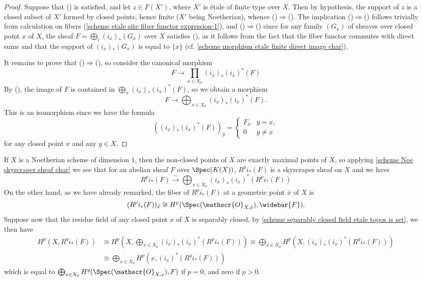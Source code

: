 \begin{proof}
Suppose that () is satisfied, and let $z\in F(X')$, where $X'$ is \'etale of finite type over $X$. Then by hypothesis, the support of $z$ is a closed subset of $X'$ formed by closed points, hence finite ($X'$ being Noetherian), whence ()$\Rightarrow$(). The implication ()$\Rightarrow$() follows trivially from calculation on fibers (\cref{scheme etale site fiber functor expression-1}), and ()$\Rightarrow$() since for any family $(G_x)$ of sheaves over closed point $x$ of $X$, the sheaf $F=\bigoplus_i(i_x)_*(G_x)$ over $X$ satisfies (), as it follows from the fact that the fiber functor commutes with direct sums and that the support of $(i_x)_*(G_x)$ is equal to $\{x\}$ (cf. \cref{scheme morphism etale finite direct image char}).\par
It remains to prove that ()$\Rightarrow$(), so consider the canonical morphism
\[F\to \prod_{x\in X_0}(i_x)_*(i_x)^*(F)\]
By (), the image of $F$ is contained in $\bigoplus_x(i_x)_*(i_x)^*(F)$, so we obtain a morphism
\[F\to\bigoplus_{x\in X_0}(i_x)_*(i_x)^*(F).\]
This is an isomorphism since we have the formula
\[((i_x)_*(i_x)^*(F))_{\bar{y}}=\begin{cases}
F_{\bar{x}}&y=x,\\
0&y\neq x
\end{cases}\]
for any closed point $x$ and any $y\in X$.
\end{proof}

If $X$ is a Noetherian scheme of dimension $1$, then the non-closed points of $X$ are exactly maximal points of $X$, so applying \cref{scheme Noe skyscraper sheaf char} we see that for an abelian sheaf $F$ over $\Spec(K(X))$, $R^pi_*(F)$ is a skyscraper sheaf on $X$ and we have
\[R^pi_*(F) \stackrel{\sim}{\to} \bigoplus_{x\in X_0}(i_x)_*(i_x)^*(R^pi_*(F))\]
On the other hand, as we have already remarked, the fiber of $R^pi_*(F)$ at a geometric point $\bar{x}$ of $X$ is 
\[(R^pi_*(F))_{\bar{x}}\cong H^p(\Spec(\mathscr{O}_{X,\bar{x}}),\widebar{F}).\]
Suppose now that the residue field of any closed point $x$ of $X$ is separably closed, by \cref{scheme separably closed field etale topos is set}, we then have
\begin{align*}
H^p(X,R^qi_*(F))&\cong H^p(X,\bigoplus_{x\in X_0}(i_x)_*(i_x)^*(R^pi_*(F)))\cong \bigoplus_{x\in X_0}H^p(X,(i_x)_*(i_x)^*(R^qi_*(F)))\\
&\cong \bigoplus_{x\in X_0}H^p(x,(i_x)^*(R^qi_*(F)))
\end{align*}
which is equal to $\bigoplus_{x\in X_0}H^q(\Spec(\mathscr{O}_{X,x}),F)$ if $p=0$, and zero if $p>0$.

